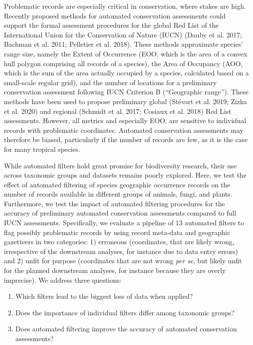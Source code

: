 \documentclass[fleqn,10pt,lineno]{wlpeerj} %
\providecommand{\tightlist}{
\setlength{\itemsep}{0pt}\setlength{\parskip}{0pt}}
\begin{document}
Problematic records are especially critical in conservation, where stakes are high. Recently proposed methods for automated conservation assessments could support the formal assessment procedures for the global Red List of the International Union for the Conservation of Nature (IUCN) (Dauby et al. 2017; Bachman et al. 2011; Pelletier et al. 2018). These methods approximate species' range size, namely the Extent of Occurrence (EOO, which is the area of a convex hull polygon comprising all records of a species), the Area of Occupancy (AOO, which is the sum of the area actually occupied by a species, calculated based on a small-scale regular grid), and the number of locations for a preliminary conservation assessment following IUCN Criterion B (``Geographic range''). These methods have been used to propose preliminary global (Stévart et al. 2019; Zizka et al. 2020) and regional (Schmidt et al. 2017; Cosiaux et al. 2018) Red List assessments. However, all metrics and especially EOO, are sensitive to individual records with problematic coordinates. Automated conservation assessments may therefore be biased, particularly if the number of records are few, as it is the case for many tropical species.

While automated filters hold great promise for biodiversity research, their use across taxonomic groups and datasets remains poorly explored. Here, we test the effect of automated filtering of species geographic occurrence records on the number of records available in different groups of animals, fungi, and plants. Furthermore, we test the impact of automated filtering procedures for the accuracy of preliminary automated conservation assessments compared to full IUCN assessments. Specifically, we evaluate a pipeline of 13 automated filters to flag possibly problematic records by using record meta-data and geographic gazetteers in two categories: 1) erroneous (coordinates, that are likely wrong, irrespective of the downstream analyses, for instance due to data entry errors) and 2) unfit for purpose (coordinates that are not wrong \emph{per se}, but likely unfit for the planned downstream analyses, for instance because they are overly imprecise). We address three questions:

\begin{enumerate}
\def\labelenumi{\arabic{enumi}.}
\tightlist
\item
  Which filters lead to the biggest loss of data when applied?
\item
  Does the importance of individual filters differ among taxonomic groups?
\item
  Does automated filtering improve the accuracy of automated conservation assessments?
\end{enumerate}
\end{document}
